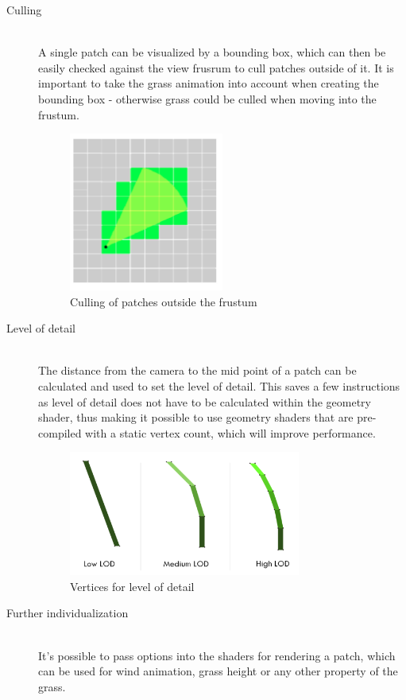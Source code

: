 \documentclass[conference]{acmsiggraph}
\begin{document}
\begin{description}
  \item[Culling] \hfill \\
  A single patch can be visualized by a bounding box, which can then be easily checked against the view frusrum to cull patches outside of it. It is important to take the grass animation into account when creating the bounding box - otherwise grass could be culled when moving into the frustum.
   \begin{figure}[ht]
   \centering
   \includegraphics[width=2.0in]{images/culling}
   \caption{Culling of patches outside the frustum}
 \end{figure}    
  
  \item[Level of detail] \hfill \\
  The distance from the camera to the mid point of a patch can be calculated and used to set the level of detail. This saves a few instructions as level of detail does not have to be calculated within the geometry shader, thus making it possible to use geometry shaders that are pre-compiled with a static vertex count, which will improve performance.

 \begin{figure}[ht]
   \centering
   \includegraphics[width=3.0in]{images/lod}
   \caption{Vertices for level of detail}
 \end{figure}  
  
  \item[Further individualization] \hfill \\
	It's possible to pass options into the shaders for rendering a patch, which can be used for wind animation, grass height or any other property of the grass.
\end{description}
\end{document}
